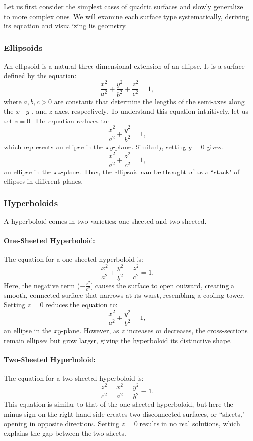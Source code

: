 \noindent Let us first consider the simplest cases of quadric surfaces and slowly generalize to more complex ones. We will examine each surface type systematically, deriving its equation and visualizing its geometry.

\subsubsection*{Ellipsoids}

\noindent An ellipsoid is a natural three-dimensional extension of an ellipse. It is a surface defined by the equation:
\[
\frac{x^2}{a^2} + \frac{y^2}{b^2} + \frac{z^2}{c^2} = 1,
\]
where \( a, b, c > 0 \) are constants that determine the lengths of the semi-axes along the \( x \)-, \( y \)-, and \( z \)-axes, respectively. To understand this equation intuitively, let us set \( z = 0 \). The equation reduces to:
\[
\frac{x^2}{a^2} + \frac{y^2}{b^2} = 1,
\]
which represents an ellipse in the \( xy \)-plane. Similarly, setting \( y = 0 \) gives:
\[
\frac{x^2}{a^2} + \frac{z^2}{c^2} = 1,
\]
an ellipse in the \( xz \)-plane. Thus, the ellipsoid can be thought of as a ``stack" of ellipses in different planes.

\subsubsection*{Hyperboloids}

\noindent A hyperboloid comes in two varieties: one-sheeted and two-sheeted.

\paragraph{One-Sheeted Hyperboloid:} The equation for a one-sheeted hyperboloid is:
\[
\frac{x^2}{a^2} + \frac{y^2}{b^2} - \frac{z^2}{c^2} = 1.
\]
\noindent Here, the negative term (\( -\frac{z^2}{c^2} \)) causes the surface to open outward, creating a smooth, connected surface that narrows at its waist, resembling a cooling tower. Setting \( z = 0 \) reduces the equation to:
\[
\frac{x^2}{a^2} + \frac{y^2}{b^2} = 1,
\]
an ellipse in the \( xy \)-plane. However, as \( z \) increases or decreases, the cross-sections remain ellipses but grow larger, giving the hyperboloid its distinctive shape.

\paragraph{Two-Sheeted Hyperboloid:} The equation for a two-sheeted hyperboloid is:
\[
\frac{z^2}{c^2} - \frac{x^2}{a^2} - \frac{y^2}{b^2} = 1.
\]
\noindent This equation is similar to that of the one-sheeted hyperboloid, but here the minus sign on the right-hand side creates two disconnected surfaces, or ``sheets," opening in opposite directions. Setting \( z = 0 \) results in no real solutions, which explains the gap between the two sheets.






